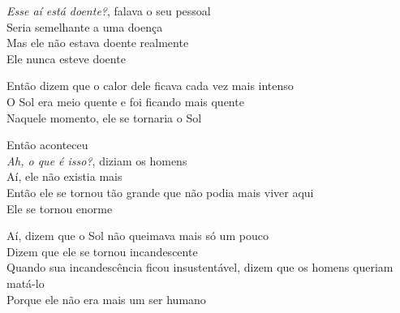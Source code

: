 \bigskip

\begin{linenumbers}
\noindent \textit{Esse aí está doente?}, falava o seu pessoal\\
Seria semelhante a uma doença\\
Mas ele não estava doente realmente\\
Ele nunca esteve doente
\end{linenumbers}

\bigskip

\begin{linenumbers}
\noindent Então dizem que o calor dele ficava cada vez mais intenso\\
O Sol era meio quente e foi ficando mais quente\\
Naquele momento, ele se tornaria o Sol
\end{linenumbers}

\bigskip

\begin{linenumbers}
\noindent Então aconteceu\\
\textit{Ah, o que é isso?}, diziam os homens\\
Aí, ele não existia mais\\
Então ele se tornou tão grande que não podia mais viver aqui\\
Ele se tornou enorme
\end{linenumbers}

\bigskip

\begin{linenumbers}
\noindent Aí, dizem que o Sol não queimava mais só um pouco\\
Dizem que ele se tornou incandescente\\
Quando sua incandescência ficou insustentável, dizem que os homens
queriam matá-lo\\
Porque ele não era mais um ser humano
\end{linenumbers}

